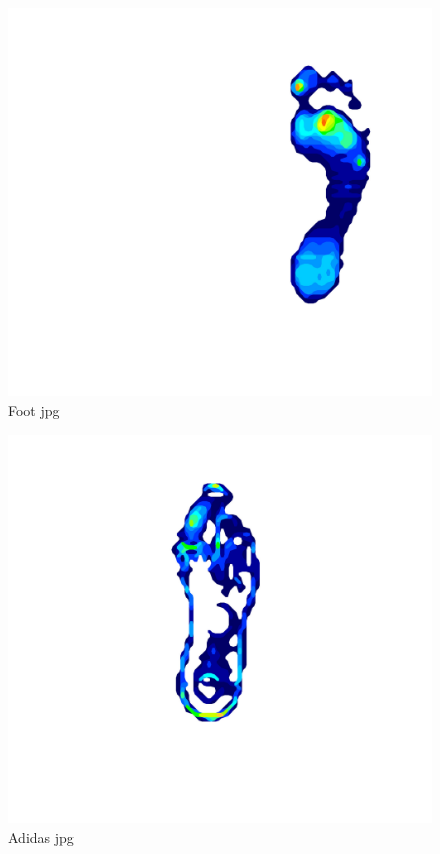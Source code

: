 \begin{figure}[!htp]
\centering
\includegraphics[scale=0.2]{Mat_Foot}
\caption{Foot jpg}
\label{Image 2}
\end{figure}

\begin{figure}[!htp]
\centering
\includegraphics[scale=0.2]{Mat_shoe}
\caption{Adidas jpg}
\label{Image 3}
\end{figure}

